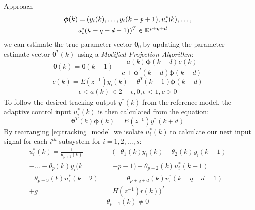 \begin{section}{Approach}
	\begin{align}
	\begin{split}
	\bm{\phi}(k)&=(y_i(k), \dots ,y_i(k-p+1),u^*_i(k), \dots , \\
	& u^*_i(k-q-d+1))^T \in \mathbb{R}^{p+q+d}
	\end{split}
	\end{align}
we can estimate the true parameter vector $\bm{\theta}_0$ by updating the parameter estimate vector $\bm{\theta}^T(k)$ using a \textit{Modified Projection Algorithm}:
	\begin{equation}
	\label{eq:Modified_Proj_Algorithm}
	\bm{\theta}(k)=\bm{\theta}(k-1)+\frac{a(k)\bm{\phi}(k-d)e(k)}{c+\bm{\phi}^T(k-d)\bm{\phi}(k-d)}
	\end{equation}
	\begin{equation}
	e(k)=E(z^{-1})y_i(k)-\theta^T(k-1)\bm{\phi}(k-d)
	\end{equation}
	\begin{align*}
	\epsilon<a(k)<2-\epsilon, 0,\epsilon<1, c>0
	\end{align*}
To follow the desired tracking output $y^*(k)$ from the reference model, the adaptive control input $u^*_i(k)$ is then calculated from the equation:
    \begin{equation}
    \label{eq:tracking_model}
	\bm{\theta}^T(k)\bm{\phi}(k)=E(z^{-1})y^*(k+d)
	\end{equation}
By rearranging \eqref{eq:tracking_model} we isolate $u^*_i(k)$ to calculate our next input signal for each $i^{th}$ subsystem for $i=1,2,\dots,s$:
	\begin{align}
	\label{eq:End}
	u^*_i(k)=\frac{1}{\theta_{p+1}(k)}&(-\theta_1(k)y_i(k)-\theta_2(k)y_i(k-1)  \nonumber \\
    -\dots-\theta_p(k)y_i(k&-p-1)-\theta_{p+2}(k)u^*_i(k-1)  \\
	-\theta_{p+3}(k)u^*_i(k-2)-& \dots - \theta_{p+q+d}(k)u^*_i(k-q-d+1) \nonumber \\
	+g&H(z^{-1})r(k))^T \nonumber
	\end{align}
    \begin{equation}
	\theta_{p+1}(k)\neq0 \nonumber
	\end{equation}


\end{section}

